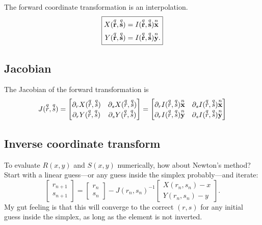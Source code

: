 The forward coordinate transformation is an interpolation.
%
\begin{equation}
\boxed{
\begin{aligned}
X(\q{\ve r}, \q{\ve s}) &= I(\q{\ve r}, \q{\ve s}) \n{\ve x} \\
Y(\q{\ve r}, \q{\ve s}) &= I(\q{\ve r}, \q{\ve s}) \n{\ve y}.
\end{aligned}
}%
\end{equation}

\subsection{Jacobian}

The Jacobian of the forward transformation is
%
\begin{equation}
J(\overset{q}{r}, \overset{q}{s}) =
\begin{bmatrix}
\partial_r X(\overset{q}{r}, \overset{q}{s}) & \partial_s X(\overset{q}{r}, \overset{q}{s}) \\
\partial_r Y(\overset{q}{r}, \overset{q}{s}) & \partial_s Y(\overset{q}{r}, \overset{q}{s})
\end{bmatrix}
=
\begin{bmatrix}
\partial_r I(\overset{q}{r}, \overset{q}{s}) \overset{n}{\textbf{x}} & \partial_s I(\overset{q}{r}, \overset{q}{s}) \overset{n}{\textbf{x}} \\
\partial_r I(\overset{q}{r}, \overset{q}{s}) \overset{n}{\textbf{y}} & \partial_s I(\overset{q}{r}, \overset{q}{s}) \overset{n}{\textbf{y}}
\end{bmatrix}
\end{equation}

\subsection{Inverse coordinate transform}

To evaluate $R(x,y)$ and $S(x,y)$ numerically, how about Newton's method?  Start with a linear guess---or any guess inside the simplex probably---and iterate:
%
\begin{equation}
\boxed{
\begin{bmatrix} r_{n+1} \\ s_{n+1} \end{bmatrix}
=
\begin{bmatrix} r_n \\ s_n \end{bmatrix}
-
J(r_n, s_n)^{-1}
\begin{bmatrix}X(r_n, s_n) - x \\ Y(r_n, s_n) - y \end{bmatrix}.
}%
\end{equation}
%
My gut feeling is that this will converge to the correct $(r,s)$ for any initial guess inside the simplex, as long as the element is not inverted.


